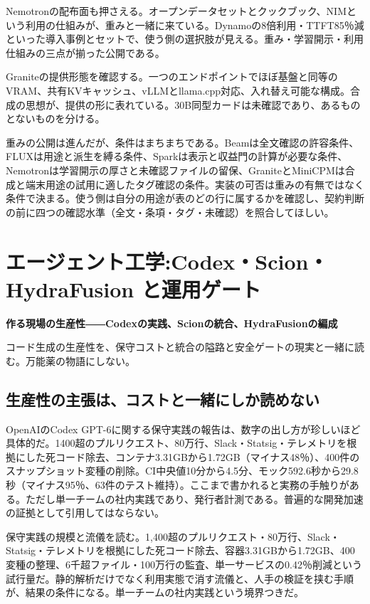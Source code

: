 \documentclass[lualatex,a4paper,10pt]{jlreq}
\begin{document}
Nemotronの配布面も押さえる。オープンデータセットとクックブック、NIMという利用の仕組みが、重みと一緒に来ている。Dynamoの8倍利用・TTFT85％減といった導入事例とセットで、使う側の選択肢が見える。重み・学習開示・利用仕組みの三点が揃った公開である。
\cite{B21,B72,B22,B20}


Graniteの提供形態を確認する。一つのエンドポイントでほぼ基盤と同等のVRAM、共有KVキャッシュ、vLLMとllama.cpp対応、入れ替え可能な構成。合成の思想が、提供の形に表れている。30B同型カードは未確認であり、あるものとないものを分ける。
\cite{B24,B73,B23,B25}


重みの公開は進んだが、条件はまちまちである。Beamは全文確認の許容条件、FLUXは用途と派生を縛る条件、Sparkは表示と収益門の計算が必要な条件、Nemotronは学習開示の厚さと未確認ファイルの留保、GraniteとMiniCPMは合成と端末用途の試用に適したタグ確認の条件。実装の可否は重みの有無ではなく条件で決まる。使う側は自分の用途が表のどの行に属するかを確認し、契約判断の前に四つの確認水準（全文・条項・タグ・未確認）を照合してほしい。
\cite{B14,B70,B15,B13,B71,B17,B19,B18,B16,B21,B72,B22,B20,B24,B73,B23,B25,B27,B74,B26,B29,B28,B30}


\section{エージェント工学:Codex・Scion・HydraFusion と運用ゲート}
\label{sec:P4}

{\Large\bfseries 作る現場の生産性――Codexの実践、Scionの統合、HydraFusionの編成\par}
\smallskip
{\color{SurveyMuted}コード生成の生産性を、保守コストと統合の隘路と安全ゲートの現実と一緒に読む。万能薬の物語にしない。\par}
\bigskip

\subsection*{生産性の主張は、コストと一緒にしか読めない}

OpenAIのCodex GPT-6に関する保守実践の報告は、数字の出し方が珍しいほど具体的だ。1400超のプルリクエスト、80万行、Slack・Statsig・テレメトリを根拠にした死コード除去、コンテナ3.31GBから1.72GB（マイナス48％）、400件のスナップショット変種の削除。CI中央値10分から4.5分、モック592.6秒から29.8秒（マイナス95％、63件のテスト維持）。ここまで書かれると実務の手触りがある。ただし単一チームの社内実践であり、発行者計測である。普遍的な開発加速の証拠として引用してはならない。
\cite{B31}


保守実践の規模と流儀を読む。1,400超のプルリクエスト・80万行、Slack・Statsig・テレメトリを根拠にした死コード除去、容器3.31GBから1.72GB、400変種の整理、6千超ファイル・100万行の監査、単一サービスの0.42％削減という試行量だ。静的解析だけでなく利用実態で消す流儀と、人手の検証を挟む手順が、結果の条件になる。単一チームの社内実践という境界つきだ。
\cite{B31}
\end{document}
